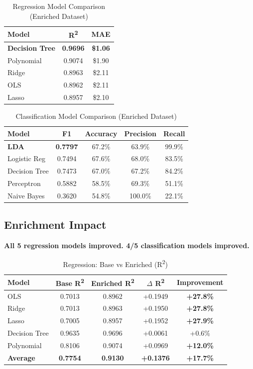\documentclass[12pt,a4paper]{article}
\begin{document}
\begin{table}[H]
\centering
\caption{Regression Model Comparison (Enriched Dataset)}
\begin{tabular}{lcc}
\toprule
\textbf{Model} & \textbf{R\textsuperscript{2}} & \textbf{MAE} \\
\midrule
\textbf{Decision Tree} & \textbf{0.9696} & \textbf{\$1.06} \\
Polynomial & 0.9074 & \$1.90 \\
Ridge & 0.8963 & \$2.11 \\
OLS & 0.8962 & \$2.11 \\
Lasso & 0.8957 & \$2.10 \\
\bottomrule
\end{tabular}
\end{table}

\begin{table}[H]
\centering
\caption{Classification Model Comparison (Enriched Dataset)}
\begin{tabular}{lcccc}
\toprule
\textbf{Model} & \textbf{F1} & \textbf{Accuracy} & \textbf{Precision} & \textbf{Recall} \\
\midrule
\textbf{LDA} & \textbf{0.7797} & 67.2\% & 63.9\% & 99.9\% \\
Logistic Reg & 0.7494 & 67.6\% & 68.0\% & 83.5\% \\
Decision Tree & 0.7473 & 67.0\% & 67.2\% & 84.2\% \\
Perceptron & 0.5882 & 58.5\% & 69.3\% & 51.1\% \\
Naive Bayes & 0.3620 & 54.8\% & 100.0\% & 22.1\% \\
\bottomrule
\end{tabular}
\end{table}

\subsection{Enrichment Impact}

\textbf{All 5 regression models improved. 4/5 classification models improved.}

\begin{table}[H]
\centering
\caption{Regression: Base vs Enriched (R\textsuperscript{2})}
\begin{tabular}{lcccc}
\toprule
\textbf{Model} & \textbf{Base R\textsuperscript{2}} & \textbf{Enriched R\textsuperscript{2}} & \textbf{$\Delta$ R\textsuperscript{2}} & \textbf{Improvement} \\
\midrule
OLS & 0.7013 & 0.8962 & +0.1949 & \textbf{+27.8\%} \\
Ridge & 0.7013 & 0.8963 & +0.1950 & \textbf{+27.8\%} \\
Lasso & 0.7005 & 0.8957 & +0.1952 & \textbf{+27.9\%} \\
Decision Tree & 0.9635 & 0.9696 & +0.0061 & +0.6\% \\
Polynomial & 0.8106 & 0.9074 & +0.0969 & \textbf{+12.0\%} \\
\midrule
\textbf{Average} & \textbf{0.7754} & \textbf{0.9130} & \textbf{+0.1376} & \textbf{+17.7\%} \\
\bottomrule
\end{tabular}
\end{table}
\end{document}

